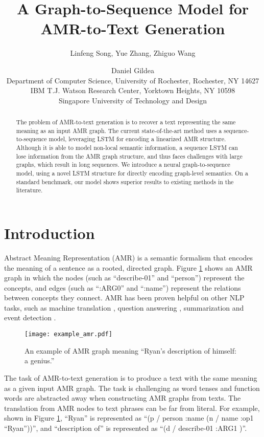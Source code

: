 \documentclass[11pt,a4paper]{article}
\title{A Graph-to-Sequence Model for AMR-to-Text Generation}
\author{Linfeng Song, Yue Zhang, Zhiguo Wang \and Daniel Gildea \\
  Department of Computer Science, University of Rochester, Rochester, NY 14627 \\
  IBM T.J. Watson Research Center, Yorktown Heights, NY 10598 \\
  Singapore University of Technology and Design}
\date{}
\begin{document}
\maketitle
\begin{abstract}
  The problem of AMR-to-text generation is to recover a text representing the same meaning as an input AMR graph.
  The current state-of-the-art method uses a sequence-to-sequence model, leveraging LSTM for encoding a linearized AMR structure. 
  Although it is able to model non-local semantic information, a sequence LSTM can lose information from the AMR graph structure, and thus faces challenges with large graphs, which result in long sequences. 
  We introduce a neural graph-to-sequence model, using a novel LSTM structure for directly encoding graph-level semantics.
  On a standard benchmark, our model shows superior results to existing methods in the literature.
\end{abstract}


\section{Introduction}


Abstract Meaning Representation (AMR) \cite{banarescu-EtAl:2013:LAW7-ID} is a semantic formalism that encodes the meaning of a sentence as a rooted, directed graph.
Figure \ref{fig:example_amr} shows an AMR graph in which the nodes (such as ``describe-01'' and ``person'') represent the concepts, and edges (such as ``:ARG0'' and ``:name'') represent the relations between concepts they connect.
AMR has been proven helpful on other NLP tasks, such as machine translation \cite{jones2012semantics,tamchyna-quirk-galley:2015:S2MT}, question answering \cite{mitra2015addressing}, summarization \cite{takase-EtAl:2016:EMNLP2016} and event detection \cite{li-EtAl:2015:CNewsStory}.


\begin{figure}
\centering
\texttt{[image: example\_amr.pdf]}
\caption{An example of AMR graph meaning ``Ryan's description of himself: a genius.''}
\label{fig:example_amr}
\end{figure}


The task of AMR-to-text generation is to produce a text with the same meaning as a given input AMR graph. 
The task is challenging as word tenses and function words are abstracted away when constructing AMR graphs from texts.
The translation from AMR nodes to text phrases can be far from literal.
For example, shown in Figure \ref{fig:example_amr}, ``Ryan'' is represented as ``(p / person :name (n / name :op1 ``Ryan''))'', and ``description of'' is represented as ``(d / describe-01 :ARG1 )''.
\end{document}
